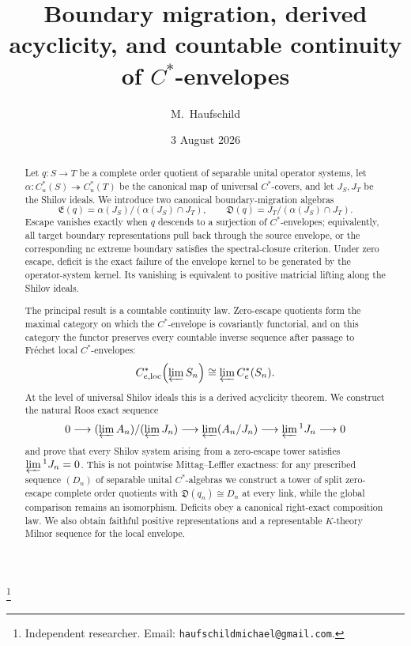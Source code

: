 \documentclass[11pt,a4paper]{amsart}
\theoremstyle{plain}
\theoremstyle{definition}
\newcommand{\Cu}{C_u^*}
\newcommand{\Ce}{C_e^*}
\newcommand{\Celoc}{C_{e,\mathrm{loc}}^*}
\newcommand{\Esc}{\mathfrak E}
\newcommand{\Def}{\mathfrak D}
\begin{document}
\title[Boundary migration and derived acyclicity]{Boundary migration, derived acyclicity, and countable continuity of $C^*$-envelopes}

\author{M.~Haufschild}
\thanks{Independent researcher. Email: \texttt{haufschildmichael@gmail.com}.}

\date{3 August 2026}


\begin{abstract}
Let $q:S\to T$ be a complete order quotient of separable unital operator systems, let
$\alpha:\Cu(S)\twoheadrightarrow\Cu(T)$ be the canonical map of universal $C^*$-covers,
and let $J_S,J_T$ be the Shilov ideals.  We introduce two canonical boundary-migration
algebras
\[
 \Esc(q)=\alpha(J_S)/(\alpha(J_S)\cap J_T),\qquad
 \Def(q)=J_T/(\alpha(J_S)\cap J_T).
\]
Escape vanishes exactly when $q$ descends to a surjection of $C^*$-envelopes; equivalently,
all target boundary representations pull back through the source envelope, or the corresponding
nc extreme boundary satisfies the spectral-closure criterion.  Under zero escape, deficit is the
exact failure of the envelope kernel to be generated by the operator-system kernel.  Its vanishing
is equivalent to positive matricial lifting along the Shilov ideals.

The principal result is a countable continuity law.  Zero-escape quotients form the maximal
category on which the $C^*$-envelope is covariantly functorial, and on this category the functor
preserves every countable inverse sequence after passage to Fr\'echet local $C^*$-envelopes:
\[
 \Celoc\!\left(\varprojlim S_n\right)\cong\varprojlim \Ce(S_n).
\]
At the level of universal Shilov ideals this is a derived acyclicity theorem.  We construct the
natural Roos exact sequence
\[
 0\longrightarrow (\varprojlim A_n)/(\varprojlim J_n)
 \longrightarrow\varprojlim(A_n/J_n)
 \longrightarrow\varprojlim{}^1J_n\longrightarrow0
\]
and prove that every Shilov system arising from a zero-escape tower satisfies
$\varprojlim{}^1J_n=0$.  This is not pointwise Mittag--Leffler exactness: for any prescribed
sequence $(D_n)$ of separable unital $C^*$-algebras we construct a tower of split zero-escape
complete order quotients with $\Def(q_n)\cong D_n$ at every link, while the global comparison
remains an isomorphism.  Deficits obey a canonical right-exact composition law.  We also obtain
faithful positive representations and a representable $K$-theory Milnor sequence for the local
envelope.
\end{abstract}
\end{document}

